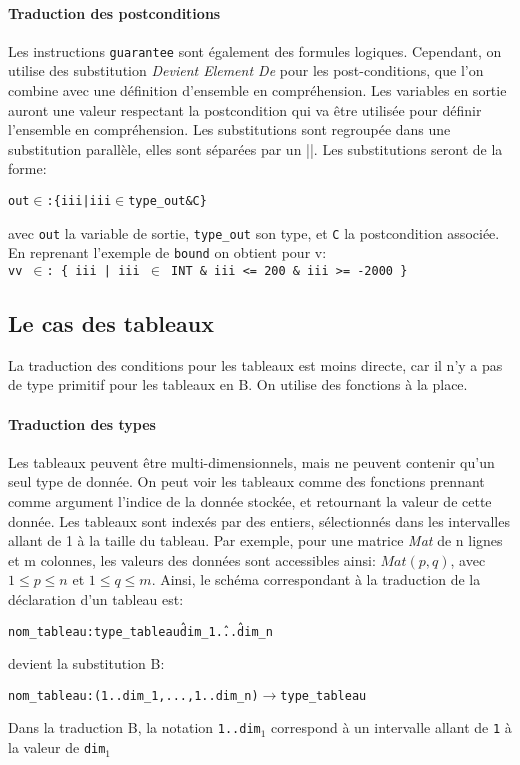 \paragraph{Traduction des postconditions}
Les instructions \texttt{guarantee} sont également des formules
logiques. Cependant, on utilise des substitution \emph{Devient Element De} pour
les post-conditions, que l'on combine avec une définition d'ensemble
en compréhension. Les variables en sortie auront une valeur respectant
la postcondition qui va être utilisée pour définir l'ensemble en
compréhension. 
Les substitutions sont regroupée dans une substitution parallèle,
elles sont séparées par un ||. 
Les substitutions seront de la forme:
\begin{alltt}
out \(\in\): \{ iii | iii \(\in\) type_out & C \}
\end{alltt}
avec \texttt{out} la variable de sortie, \texttt{type\_out} son type, et \texttt{C} la
postcondition associée.\\
En reprenant l'exemple de \texttt{bound} on obtient pour v:\\
\texttt{vv $\in$: \{ iii | iii $\in$ INT \& iii <= 200 \& iii >= -2000 \}}



\subsection{Le cas des tableaux}
La traduction des conditions pour les tableaux est moins directe, car il n'y a
pas de type primitif pour les tableaux en B. On utilise des fonctions à la
place. 

\paragraph{Traduction des types}
Les tableaux peuvent être multi-dimensionnels, mais ne peuvent contenir qu'un
seul type de donnée. On peut voir les tableaux comme des fonctions prennant
comme argument l'indice de la donnée stockée, et retournant la valeur de cette
donnée. Les tableaux sont indexés par des entiers, sélectionnés dans les
intervalles allant de 1 à la taille du tableau.
Par exemple, pour une matrice \emph{Mat} de n lignes et m colonnes, les valeurs
des données sont accessibles ainsi: $Mat(p, q)$, avec $1 \leq p \leq n$ et $1 \leq q
\leq m$.
Ainsi, le schéma correspondant à la traduction de la déclaration d'un tableau
est:
\begin{alltt}
nom\_tableau : type\_tableau \^ dim_1 \^ ... \^ dim_n
\end{alltt}
devient la substitution B:
\begin{alltt}
nom\_tableau : (1..dim_1, ..., 1..dim_n) \(\rightarrow\) type\_tableau 
\end{alltt}
Dans la traduction B, la notation \texttt{1..dim$_1$} correspond à un
intervalle allant de \texttt{1} à la valeur de \texttt{dim$_1$}
